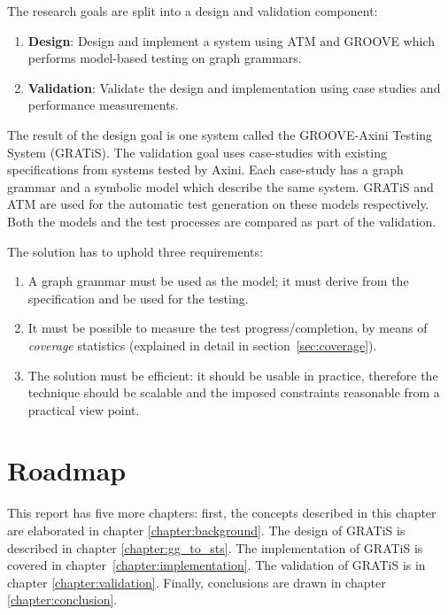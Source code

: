 The research goals are split into a design and validation component:
\begin{enumerate}
    \item \textbf{Design}: Design and implement a system using ATM and GROOVE which performs model-based testing on graph grammars.
    \item \textbf{Validation}: Validate the design and implementation using case studies and performance measurements.
\end{enumerate}

The result of the design goal is one system called the GROOVE-Axini Testing System (GRATiS). The validation goal uses case-studies with existing specifications from systems tested by Axini. Each case-study has a graph grammar and a symbolic model which describe the same system. GRATiS and ATM are used for the automatic test generation on these models respectively. Both the models and the test processes are compared as part of the validation.

The solution has to uphold three requirements:
\begin{enumerate}
\item A graph grammar must be used as the model; it must derive from the specification and be used for the testing.
\item It must be possible to measure the test progress/completion, by means of \textit{coverage} statistics (explained in detail in section~\ref{sec:coverage}).
\item The solution must be efficient: it should be usable in practice, therefore the technique should be scalable and the imposed constraints reasonable from a practical view point.
\end{enumerate}

\section{Roadmap}
This report has five more chapters: first, the concepts described in this chapter are elaborated in chapter \ref{chapter:background}. The design of GRATiS is described in chapter \ref{chapter:gg_to_sts}. The implementation of GRATiS is covered in chapter~\ref{chapter:implementation}. The validation of GRATiS is in chapter \ref{chapter:validation}. Finally, conclusions are drawn in chapter \ref{chapter:conclusion}. 
